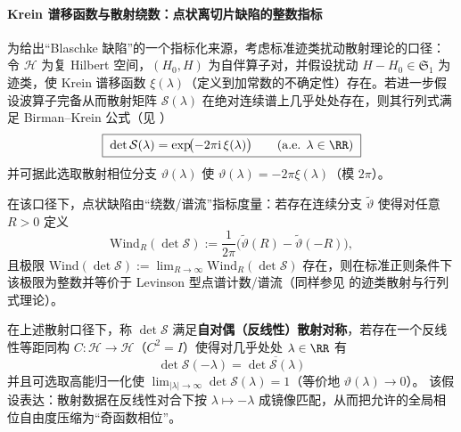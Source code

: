 \paragraph{Krein 谱移函数与散射绕数：点状离切片缺陷的整数指标}\label{par:selfdual-krein-wind}
为给出“Blaschke 缺陷”的一个指标化来源，考虑标准迹类扰动散射理论的口径：令 \(\mathcal H\) 为复 Hilbert 空间，\((H_0,H)\) 为自伴算子对，并假设扰动 \(H-H_0\in\mathfrak S_1\) 为迹类，使 Krein 谱移函数 \(\xi(\lambda)\)（定义到加常数的不确定性）存在。若进一步假设波算子完备从而散射矩阵 \(\mathcal S(\lambda)\) 在绝对连续谱上几乎处处存在，则其行列式满足 Birman--Krein 公式（见 \cite{Simon2005TraceIdeals,Yafaev1992ScatteringGeneralTheory}）
\begin{equation}\label{eq:birman-krein-detS-ssf}
\boxed{\;\det\mathcal S(\lambda)=\exp\!\bigl(-2\pi\mathrm{i}\,\xi(\lambda)\bigr)\qquad(\text{a.e. }\lambda\in\RR)\;}
\end{equation}
并可据此选取散射相位分支 \(\vartheta(\lambda)\) 使
\(\vartheta(\lambda)=-2\pi\xi(\lambda)\)（模 \(2\pi\)）。
\par
在该口径下，点状缺陷由“绕数/谱流”指标度量：若存在连续分支 \(\widetilde\vartheta\) 使得对任意 \(R>0\) 定义
\begin{equation}\label{eq:scattering-wind-def}
\mathrm{Wind}_R(\det\mathcal S)
:=\frac{1}{2\pi}\bigl(\widetilde\vartheta(R)-\widetilde\vartheta(-R)\bigr),
\end{equation}
且极限 \(\mathrm{Wind}(\det\mathcal S):=\lim_{R\to\infty}\mathrm{Wind}_R(\det\mathcal S)\) 存在，则在标准正则条件下该极限为整数并等价于 Levinson 型点谱计数/谱流（同样参见 \cite{Yafaev1992ScatteringGeneralTheory,Simon2005TraceIdeals} 的迹类散射与行列式理论）。

\begin{definition}\label{def:selfdual-scattering-symmetry-ssf}
在上述散射口径下，称 \(\det\mathcal S\) 满足\textbf{自对偶（反线性）散射对称}，若存在一个反线性等距同构 \(C:\mathcal H\to\mathcal H\)（\(C^2=I\)）使得对几乎处处 \(\lambda\in\RR\) 有
\begin{equation}\label{eq:selfdual-scattering-det-sym}
\boxed{\;\det\mathcal S(-\lambda)=\overline{\det\mathcal S(\lambda)}\;}
\end{equation}
并且可选取高能归一化使 \(\lim_{|\lambda|\to\infty}\det\mathcal S(\lambda)=1\)（等价地 \(\vartheta(\lambda)\to 0\)）。
该假设表达：散射数据在反线性对合下按 \(\lambda\mapsto-\lambda\) 成镜像匹配，从而把允许的全局相位自由度压缩为“奇函数相位”。
\end{definition}

